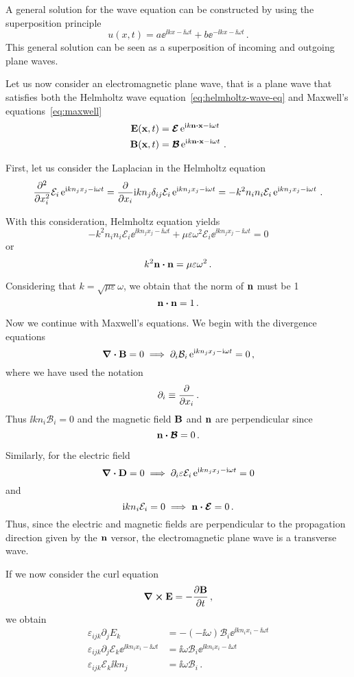 \documentclass[12pt, class=report, crop=false]{standalone}
\begin{document}
A general solution for the wave equation can be constructed by
using the superposition principle
\[
u(x,t) = a \ee^{\ii k x - \ii \omega t} + b \ee^{-\ii k x - \ii \omega t}\,.
\]
This general solution can be seen as a superposition of incoming and outgoing plane waves.

Let us now consider an electromagnetic plane wave, that is a
plane wave that satisfies both the Helmholtz wave equation~\eqref{eq:helmholtz-wave-eq}
and Maxwell's equations~\eqref{eq:maxwell}
\[
\begin{aligned}
  \vb{E}(\vb{x},t) &= \vb*{\mathcal{E}} \ee^{\ii k \vb{n} \vdot \vb{x} - \ii \omega t} \\
  \vb{B}(\vb{x},t) &= \vb*{\mathcal{B}} \ee^{\ii k \vb{n} \vdot \vb{x} - \ii \omega t}\,.
\end{aligned}
\]

First, let us consider the Laplacian in the Helmholtz equation
\[
\pdv[2]{x_i} \mathcal{E}_i \operatorname{e}^{\mathrm{i} k n_j x_j - \mathrm{i} \omega t} =
\pdv{x_i} \mathrm{i} k n_j \delta_{ij} \mathcal{E}_i \operatorname{e}^{\mathrm{i} k n_j x_j - \mathrm{i} \omega t} =
-k^2 n_i n_i \mathcal{E}_i \operatorname{e}^{\mathrm{i} k n_j x_j - \mathrm{i} \omega t}\,.
\]

With this consideration, Helmholtz equation yields
\[
-k^2 n_i n_i \mathcal{E}_i \ee^{\ii k n_j x_j - \ii \omega t}
+ \mu\varepsilon\omega^2\mathcal{E}_i \ee^{\ii k n_j x_j - \ii \omega t} = 0
\]
or
\[
k^2 \vb{n} \vdot \vb{n} = \mu\varepsilon\omega^2\,.
\]

Considering that \(k=\sqrt{\mu\varepsilon} \omega\), we obtain
that the norm of \(\vb{n}\) must be 1
\[
\vb{n}\vdot\vb{n}=1\,.
\]

Now we continue with Maxwell's equations. We begin with the divergence
equations
\[
\div{\vb{B}} = 0 \implies \partial_i \mathcal{B}_i \operatorname{e}^{\mathrm{i} k n_j x_j - \mathrm{i} \omega t} = 0\,,
\]
where we have used the notation
\[
\partial_i \equiv \pdv{x_i}\,.
\]
Thus
\(
\ii k n_i \mathcal{B}_i = 0
\)
and the magnetic field \(\vb{B}\) and \(\vb{n}\) are perpendicular since
\[
\vb{n} \vdot \vb*{\mathcal{B}} = 0\,.
\]

Similarly, for the electric field
\[
\div{\vb{D}} = 0 \implies \partial_i \varepsilon \mathcal{E}_i \operatorname{e}^{\mathrm{i} k n_j x_j - \mathrm{i} \omega t} = 0
\]
and
\[
\ii k n_i \mathcal{E}_i = 0 \implies \vb{n} \vdot \vb*{\mathcal{E}}=0\,.
\]
Thus, since the electric and magnetic fields are perpendicular to
the propagation direction given by the \(\vb{n}\) versor, the
electromagnetic plane wave is a transverse wave.

If we now consider the curl equation
\[
\curl{\vb{E}} = -\pdv{\vb{B}}{t}\,,
\]
we obtain
\[
\begin{aligned}
  \varepsilon_{ijk} \partial_j E_k &= -(-\ii \omega) \mathcal{B}_i
  \ee^{\ii k n_i x_i- \ii \omega t} \\
  \varepsilon_{ijk} \partial_j \mathcal{E}_k \ee^{\ii k n_i x_i- \ii \omega t} &= \ii \omega \mathcal{B}_i
  \ee^{\ii k n_i x_i- \ii \omega t} \\
  \varepsilon_{ijk} \mathcal{E}_k \ii k n_j &= \ii \omega \mathcal{B}_i\,.
\end{aligned}
\]
\end{document}
